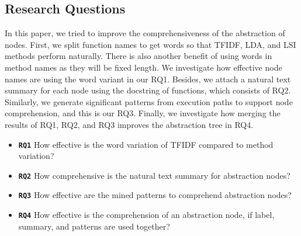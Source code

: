 \subsection{Research Questions}
In this paper, we tried to improve the comprehensiveness of the abstraction of nodes. First, we split function names to get words so that TFIDF, LDA, and LSI methods perform naturally. There is also another benefit of using words in method names as they will be fixed length. We investigate how effective node names are using the word variant in our RQ1. Besides, we attach a natural text summary for each node using the docstring of functions, which consists of RQ2. Similarly, we generate significant patterns from execution paths to support node comprehension, and this is our RQ3. Finally, we investigate how merging the results of RQ1, RQ2, and RQ3 improves the abstraction tree in RQ4. 

\begin{itemize}
    
    \item \textbf{\texttt{RQ1}} How effective is the word variation of TFIDF compared to method variation?
    \item \textbf{\texttt{RQ2}} How comprehensive is the natural text summary for abstraction nodes?
    \item \textbf{\texttt{RQ3}} How effective are the mined patterns to comprehend abstraction nodes?
    \item \textbf{\texttt{RQ4}} How effective is the comprehension of an abstraction node, if label, summary, and patterns are used together?
\end{itemize}

